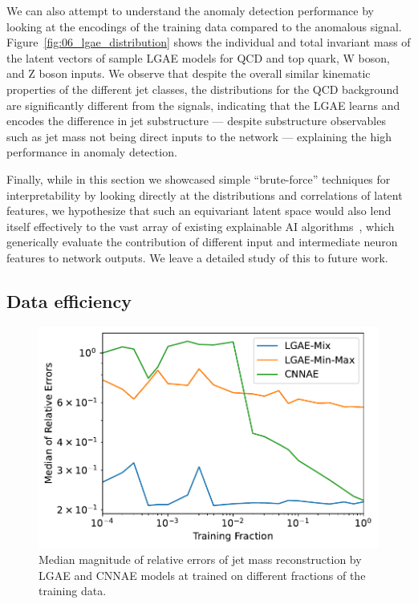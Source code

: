 We can also attempt to understand the anomaly detection performance by looking at the encodings of the training data compared to the anomalous signal.
Figure~\ref{fig:06_lgae_distribution} shows the individual and total invariant mass of the latent vectors of sample LGAE models for QCD and top quark, W boson, and Z boson inputs.
We observe that despite the overall similar kinematic properties of the different jet classes, the distributions for the QCD background are significantly different from the signals, indicating that the LGAE learns and encodes the difference in jet substructure --- despite substructure observables such as jet mass not being direct inputs to the network --- explaining the high performance in anomaly detection.

Finally, while in this section we showcased simple ``brute-force'' techniques for interpretability by looking directly at the distributions and correlations of latent features, we hypothesize that such an equivariant latent space would also lend itself effectively to the vast array of existing explainable AI algorithms~\cite{vilone_xaireview,minh_xaireview}, which generically evaluate the contribution of different input and intermediate neuron features to network outputs.
We leave a detailed study of this to future work.


\subsection{Data efficiency}
\label{sec:06_lgae_data-efficiency}

\begin{figure}[ht!]
    \centering
    \includegraphics[width=0.6\linewidth]{figures/06-ML4Jets/lgae/data_efficiency/jet_mass-rel_err-median.pdf}
    \caption{Median magnitude of relative errors of jet mass reconstruction by LGAE and CNNAE models at trained on different fractions of the training data.}
    \label{fig:06_lgae_median-jet-mass}
\end{figure}

